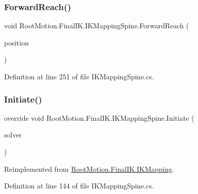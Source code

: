 \subsubsection{\texorpdfstring{Forward\+Reach()}{ForwardReach()}}
{\footnotesize\ttfamily void Root\+Motion.\+Final\+I\+K.\+I\+K\+Mapping\+Spine.\+Forward\+Reach (\begin{DoxyParamCaption}\item[{Vector3}]{position }\end{DoxyParamCaption})}



Definition at line 251 of file I\+K\+Mapping\+Spine.\+cs.

\mbox{\label{class_root_motion_1_1_final_i_k_1_1_i_k_mapping_spine_a1b6610a202659f34e6126e943fa3fb1d}} 
\subsubsection{\texorpdfstring{Initiate()}{Initiate()}}
{\footnotesize\ttfamily override void Root\+Motion.\+Final\+I\+K.\+I\+K\+Mapping\+Spine.\+Initiate (\begin{DoxyParamCaption}\item[{\mbox{\hyperlink{class_root_motion_1_1_final_i_k_1_1_i_k_solver_full_body}{I\+K\+Solver\+Full\+Body}}}]{solver }\end{DoxyParamCaption})\hspace{0.3cm}{\ttfamily [virtual]}}



Reimplemented from \mbox{\hyperlink{class_root_motion_1_1_final_i_k_1_1_i_k_mapping_a530ab0e13f90bde214eba3a23ed24d73}{Root\+Motion.\+Final\+I\+K.\+I\+K\+Mapping}}.



Definition at line 144 of file I\+K\+Mapping\+Spine.\+cs.

\mbox{\label{class_root_motion_1_1_final_i_k_1_1_i_k_mapping_spine_ab93a1e51b71ee23679b83bd407976f9d}} 

